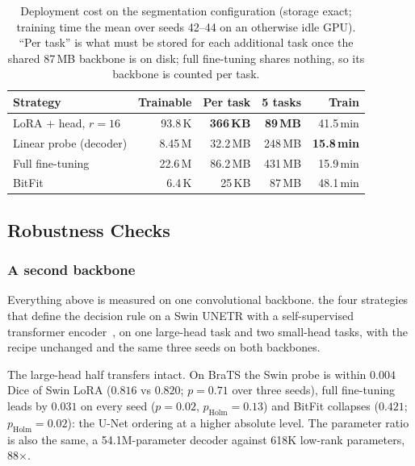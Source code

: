 \iffull\documentclass[journal]{IEEEtran}\else\documentclass[journal,twoside,web]{ieeecolor}\usepackage{generic}\fi
\begin{document}
\iffull  %
\begin{table}[t]
\caption{Deployment cost on the segmentation configuration (storage exact; training time the mean over seeds 42--44 on an otherwise idle GPU). ``Per task'' is what must be stored for each additional task once the shared 87\,MB backbone is on disk; full fine-tuning shares nothing, so its backbone is counted per task.}
\label{tab:cost}
\centering
\footnotesize
\setlength{\tabcolsep}{4pt}
\begin{tabular}{lrrrr}
\toprule
Strategy & Trainable & Per task & 5 tasks & Train \\
\midrule
LoRA + head, $r{=}16$ & 93.8\,K & \textbf{366\,KB} & \textbf{89\,MB} & 41.5\,min \\
Linear probe (decoder) & 8.45\,M & 32.2\,MB & 248\,MB & \textbf{15.8\,min} \\
Full fine-tuning & 22.6\,M & 86.2\,MB & 431\,MB & 15.9\,min \\
BitFit & 6.4\,K & 25\,KB & 87\,MB & 48.1\,min \\
\bottomrule
\end{tabular}
\end{table}
\fi  %

\subsection{Robustness Checks}
\label{sec:res_robust}

\subsubsection{A second backbone}
\label{sec:res_swin}

Everything above is measured on one convolutional backbone.  the four strategies that define the decision rule on a Swin UNETR with a self-supervised transformer encoder~\cite{hatamizadeh2022swin,tang2022selfsupervised}, on one large-head task and two small-head tasks, with the recipe unchanged and the same three seeds on both backbones.

The large-head half transfers intact. On BraTS the Swin probe is within $0.004$ Dice of Swin LoRA ($0.816$ vs $0.820$; $p=0.71$ over three seeds), full fine-tuning leads by $0.031$ on every seed ($p=0.02$, $p_{\text{Holm}}=0.13$) and BitFit collapses ($0.421$; $p_{\text{Holm}}=0.02$): the U-Net ordering at a higher absolute level. The parameter ratio is also the same, a 54.1M-parameter decoder against 618K low-rank parameters, 88$\times$.
\end{document}

